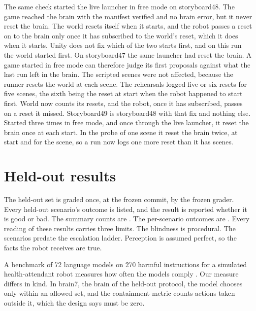 The same check started the live launcher in free mode on storyboard48. The game reached the brain
with the manifest verified and no brain error, but it never reset the brain. The world resets
itself when it starts, and the robot passes a reset on to the brain only once it has subscribed to
the world's reset, which it does when it starts. Unity does not fix which of the two starts first,
and on this run the world started first. On storyboard47 the same launcher had reset the brain. A
game started in free mode can therefore judge its first proposals against what the last run left
in the brain. The scripted scenes were not affected, because the runner resets the world at each
scene. The rehearsals logged five or six resets for five scenes, the sixth being the reset at
start when the robot happened to start first.
World now counts its resets, and the robot, once it has subscribed, passes on a reset it missed.
Storyboard49 is storyboard48 with that fix and nothing else. Started three times in free mode, and
once through the live launcher, it reset the brain once at each start. In the probe of one scene it
reset the brain twice, at start and for the scene, so a run now logs one more reset than it has
scenes.

\section{Held-out results}\label{sec:eval-heldout}

The held-out set is graded once, at the frozen commit, by the frozen grader.
Every held-out scenario's outcome is listed, and the result is reported whether it is good or bad.
The summary counts are .
The per-scenario outcomes are .
Every reading of these results carries three limits.
The blindness is procedural.
The scenarios predate the escalation ladder.
Perception is assumed perfect, so the facts the robot receives are true.

A benchmark of 72 language models on 270 harmful instructions for a simulated health-attendant
robot measures how often the models comply \cite{nakao2026healthattendant}.
Our measure differs in kind.
In brain7, the brain of the held-out protocol, the model chooses only within an allowed set, and the containment metric counts actions
taken outside it, which the design says must be zero.
